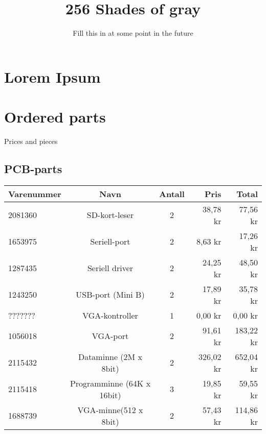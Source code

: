 \documentclass{report}
\begin{document}
\title{256 Shades of gray}
\author{Fill this in at some point in the future}
\maketitle
{}
\section{Lorem Ipsum}
\section{Ordered parts}
Prices and pieces
\subsection{PCB-parts}
\begin{tabular}{l | c | c | r | r}
Varenummer & Navn & Antall & Pris & Total \\ \hline
2081360	& SD-kort-leser & 2	& 38,78 kr & 77,56 kr \\ \hline
1653975 & Seriell-port & 2 & 8,63 kr & 17,26 kr \\ \hline
1287435	& Seriell driver &	2 & 24,25 kr & 48,50 kr \\ \hline
1243250	& USB-port (Mini B) &	2 & 17,89 kr &	35,78 kr \\ \hline
???????	& VGA-kontroller &	1 & 0,00 kr & 0,00 kr \\ \hline
1056018	& VGA-port	& 2 & 91,61 kr & 183,22 kr \\ \hline
2115432	& Dataminne (2M x 8bit) &	2 & 326,02 kr & 652,04 kr \\ \hline
2115418	& Programminne (64K x 16bit) &	3 & 19,85 kr & 59,55 kr \\ \hline
1688739	& VGA-minne(512 x 8bit) &	2 & 57,43 kr &114,86 kr \\ \hline
\end{tabular}
\end{document}
